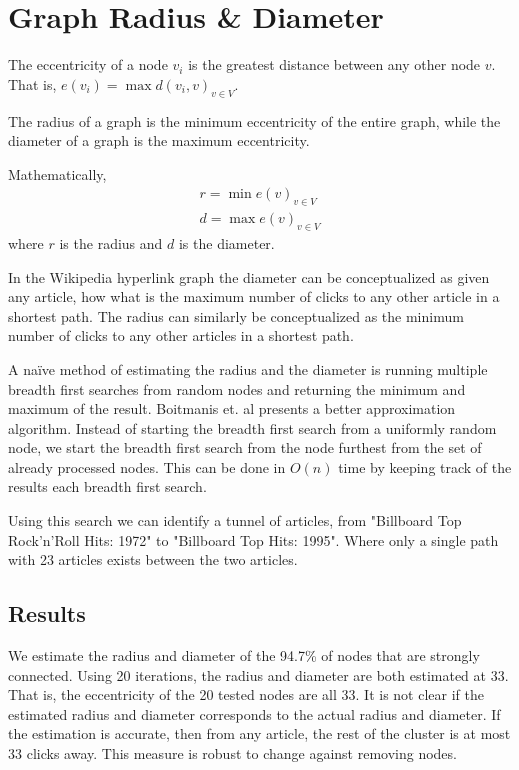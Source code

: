 \documentclass{article}
\begin{document}


\section{Graph Radius \& Diameter}

The eccentricity of a node $v_i$ is the greatest distance between any other node $v$. That is, $e(v_i) = \max d(v_i, v)_{v \in V}$.

The radius of a graph is the minimum eccentricity of the entire graph, while the diameter of a graph is the maximum eccentricity.


Mathematically,
\begin{align*}
    r = \min e(v)_{v \in V} \\
    d = \max e(v)_{v \in V}
\end{align*}
where $r$ is the radius and $d$ is the diameter.

In the Wikipedia hyperlink graph the diameter can be conceptualized as given any article, how what is the maximum number of clicks to any other article in a shortest path. The radius can similarly be conceptualized as the minimum number of clicks to any other articles in a shortest path.


A naïve method of estimating the radius and the diameter is running multiple breadth first searches from random nodes and returning the minimum and maximum of the result. Boitmanis et. al presents a better approximation algorithm.
\autocite{boitmanis}
Instead of starting the breadth first search from a uniformly random node, we start the breadth first search from the node furthest from the set of already processed nodes. This can be done in $O(n)$ time by keeping track of the results each breadth first search.

Using this search we can identify a tunnel of articles, from "Billboard Top Rock'n'Roll Hits: 1972" to "Billboard Top Hits: 1995". Where only a single path with 23 articles exists between the two articles.


\subsection{Results}

We estimate the radius and diameter of the 94.7\% of nodes that are strongly connected.
Using 20 iterations, the radius and diameter are both estimated at 33. That is, the eccentricity of the 20 tested nodes are all 33.
It is not clear if the estimated radius and diameter corresponds to the actual radius and diameter.
If the estimation is accurate, then from any article, the rest of the cluster is at most 33 clicks away.
This measure is robust to change against removing nodes.
\end{document}
